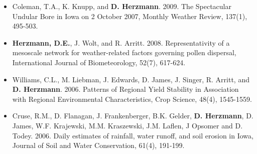 \begin{itemize}
\item Coleman, T.A., K. Knupp, and \textbf{D. Herzmann}. 2009. The Spectacular Undular Bore in Iowa on 2 October 2007, Monthly Weather Review, 137(1), 495-503.
\item \textbf{Herzmann, D.E.}, J. Wolt, and R. Arritt. 2008. Representativity of a mesoscale network for weather-related factors governing pollen dispersal, International Journal of Biometeorology, 52(7), 617-624.
\item Williams, C.L., M. Liebman, J. Edwards, D. James, J. Singer, R. Arritt, and \textbf{D. Herzmann}. 2006. Patterns of Regional Yield Stability in Association with Regional Environmental Characteristics, Crop Science, 48(4), 1545-1559.
\item Cruse, R.M., D. Flanagan, J. Frankenberger, B.K. Gelder, \textbf{D. Herzmann}, D. James, W.F. Krajewski, M.M. Kraszewski, J.M. Laflen, J Opsomer and D. Todey. 2006. Daily estimates of rainfall, water runoff, and soil erosion in Iowa, Journal of Soil and Water Conservation, 61(4), 191-199.
\end{itemize}

